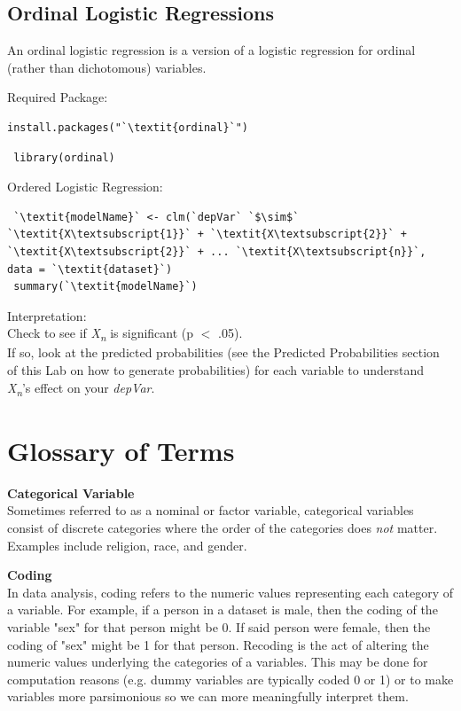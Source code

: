 \documentclass[12pt,letterpaper]{article}
\newcommand{\ind}{\phantom{AA}}
\begin{document}
\subsection{Ordinal Logistic Regressions}
An ordinal logistic regression is a version of a logistic regression for ordinal (rather than dichotomous) variables.\vspace{.5em}\\

\begin{tcolorbox}[title = Ordinal Logistic Regressions]
Required Package:
\begin{lstlisting}[frameround = t t t t, backgroundcolor = \color{lightgray}]
  install.packages("`\textit{ordinal}`")
\end{lstlisting}
\begin{lstlisting}
 library(ordinal)
\end{lstlisting}
Ordered Logistic Regression:
\begin{lstlisting}
 `\textit{modelName}` <- clm(`depVar` `$\sim$` `\textit{X\textsubscript{1}}` + `\textit{X\textsubscript{2}}` + `\textit{X\textsubscript{2}}` + ... `\textit{X\textsubscript{n}}`, data = `\textit{dataset}`)
 summary(`\textit{modelName}`)
\end{lstlisting}
Interpretation:\\
\ind Check to see if \textit{X\textsubscript{n}} is significant (p $<$ .05).\\
\ind If so, look at the predicted probabilities (see the Predicted Probabilities section \\ \ind \ind of this Lab on how to generate probabilities) for each variable to understand \\ \ind \ind \textit{X\textsubscript{n}}'s effect on your \textit{depVar}.
\end{tcolorbox}

\begingroup
\newpage
\section*{Glossary of Terms} 
\textbf{Categorical Variable} \\
Sometimes referred to as a nominal or factor variable, categorical variables consist of discrete categories where the order of the categories does \textit{not} matter. Examples include religion, race, and gender.

\vspace{1em}

\textbf{Coding}\\
In data analysis, coding refers to the numeric values representing each category of a variable. For example, if a person in a dataset is male, then the coding of the variable "sex" for that person might be 0. If said person were female, then the coding of "sex" might be 1 for that person. Recoding is the act of altering the numeric values underlying the categories of a variables. This may be done for computation reasons (e.g. dummy variables are typically coded 0 or 1) or to make variables more parsimonious so we can more meaningfully interpret them. 
\vspace{1em}
\end{document}

